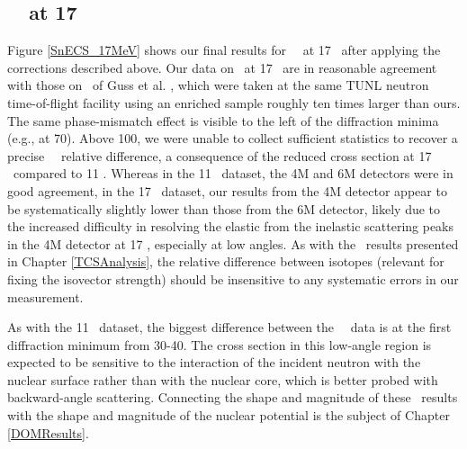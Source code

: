 \subsection{\snTwelveFour\ \el\ at 17 \mega\electronvolt}
Figure \ref{SnECS_17MeV} shows our final results for \snTwelveFour\
\el\ at 17 \mega\electronvolt\ after applying the corrections described above. Our data on \snFour\
at 17 \mega\electronvolt\ are in reasonable agreement with those on \snTwenty\ of Guss et al.
\cite{Guss1989, GussPhDThesis}, which were taken at the same TUNL neutron
time-of-flight facility using an enriched sample roughly ten
times larger than ours. The same phase-mismatch effect is visible to the left of
the diffraction minima (e.g., at 70\textdegree). Above 100\textdegree, we were unable
to collect sufficient statistics to recover a precise \snTwelveFour\ \el\
relative difference, a consequence of the reduced cross section at 17 \mega\electronvolt\
compared to 11 \mega\electronvolt. Whereas in the 11 \mega\electronvolt\ dataset, the 4M and 6M detectors were in
good agreement, in the 17 \mega\electronvolt\ dataset, our results from the 4M detector appear
to be systematically slightly lower than those from the 6M detector, likely due to the
increased difficulty in resolving the elastic from the inelastic scattering
peaks in the 4M detector at 17 \mega\electronvolt, especially at low angles. As with the \tot\
results presented in Chapter \ref{TCSAnalysis}, the relative difference between
isotopes (relevant for fixing the isovector strength) should be insensitive to any systematic 
errors in our measurement.

As with the 11 \mega\electronvolt\ dataset, the biggest difference between the
\snTwelveFour\ \el\ data is at the first diffraction minimum from
30-40\textdegree. The cross section in this low-angle region is expected
to be sensitive to the interaction of the incident neutron
with the nuclear surface rather than with the nuclear core, which
is better probed with backward-angle scattering. Connecting the shape and
magnitude of these \el\ results with the shape and magnitude of the nuclear
potential is the subject of Chapter \ref{DOMResults}.

